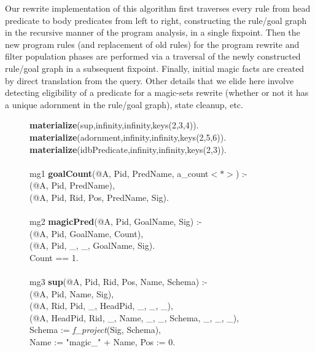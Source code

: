 Our rewrite implementation of this algorithm first traverses every rule
from head predicate to body predicates from left to right, constructing
the rule/goal graph in the recursive manner of the program analysis, in
a single fixpoint.  Then the new program rules (and replacement of old
rules) for the program rewrite and filter population phases are
performed via a traversal of the newly constructed rule/goal graph in a
subsequent fixpoint. Finally, initial magic facts are created by direct
translation from the query.  Other details that we elide here involve detecting 
eligibility of a predicate for a magic-sets rewrite (whether or not it has a unique 
adornment in the rule/goal graph), state cleanup, etc. 

\begin{figure}
\ssp
\begin{boxedminipage}{\linewidth}
{\bf materialize}(sup,infinity,infinity,keys(2,3,4)). \\
{\bf materialize}(adornment,infinity,infinity,keys(2,5,6)). \\
{\bf materialize}(idbPredicate,infinity,infinity,keys(2,3)). \\
\\
mg1 {\bf goalCount}(@A, Pid, PredName, a\_count$<*>$) :- \\
(@A, Pid, PredName), \\
(@A, Pid, Rid, Pos, PredName, Sig). \\
\\
mg2 {\bf magicPred}(@A, Pid, GoalName, Sig) :- \\
(@A, Pid, GoalName, Count), \\
(@A, Pid, \_, \_, GoalName, Sig). \\
\datalogspace Count == 1. \\
\\
mg3 {\bf sup}(@A, Pid, Rid, Pos, Name, Schema) :- \\
(@A, Pid, Name, Sig), \\
(@A, Rid, Pid, \_, HeadPid, \_, \_, \_), \\
(@A, HeadPid, Rid, \_, Name, \_, \_, Schema, \_, \_, \_), \\
\datalogspace Schema := {\em f\_project}(Sig, Schema), \\
\datalogspace Name := "magic\_" + Name, Pos := 0. \\

\end{boxedminipage}
\end{figure}
